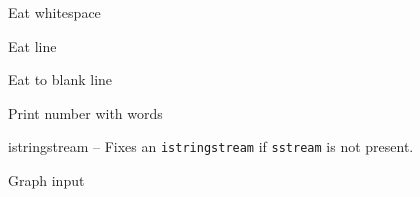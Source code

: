\categorycontents{}

\begin{algorithm}{Eat whitespace}
\end{algorithm}
\begin{algorithm}{Eat line}
\end{algorithm}
\begin{algorithm}{Eat to blank line}
\end{algorithm}
\begin{algorithm}{Print number with words}
\end{algorithm}

\begin{algorithm}{istringstream}
-- Fixes an {\tt istringstream} if {\tt sstream} is not present.
\end{algorithm}

\begin{algorithm}{Graph input}
\end{algorithm}

\begin{sourceslandscape}
\end{sourceslandscape}

